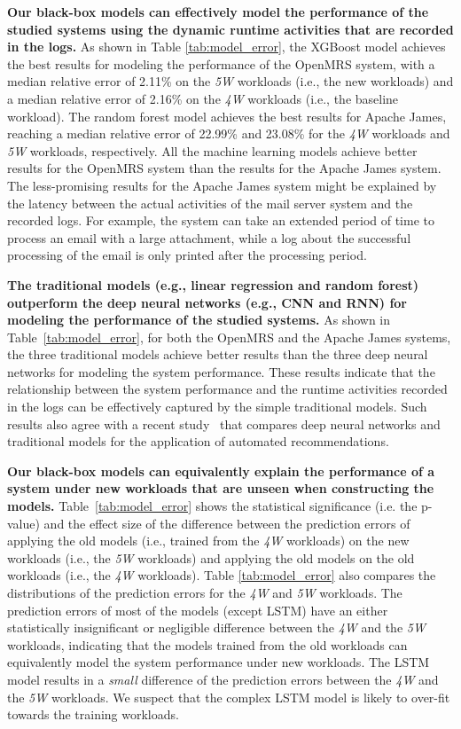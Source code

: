 \noindent\textbf{Our black-box models can effectively model the performance of the studied systems using the dynamic runtime activities that are recorded in the logs.} 
As shown in Table \ref{tab:model_error}, the XGBoost model achieves the best results for modeling the performance of the OpenMRS system, with a median relative error of 2.11\% on the \emph{5W} workloads (i.e., the new workloads) and a median relative error of 2.16\% on the \emph{4W} workloads (i.e., the baseline workload). 
The random forest model achieves the best results for Apache James, reaching a median relative error of 22.99\% and 23.08\% for the \emph{4W} workloads and \emph{5W} workloads, respectively. 
All the machine learning models achieve better results for the OpenMRS system than the results for the Apache James system.
The less-promising results for the Apache James system might be explained by the latency between the actual activities of the mail server system and the recorded logs. For example, the system can take an extended period of time to process an email with a large attachment, while a log about the successful processing of the email is only printed after the processing period.

\noindent\textbf{The traditional models (e.g., linear regression and random forest) outperform the deep neural networks (e.g., CNN and RNN) for modeling the performance of the studied systems.}
As shown in Table~\ref{tab:model_error}, for both the OpenMRS and the Apache James systems, the three traditional models achieve better results than the three deep neural networks for modeling the system performance.
These results indicate that the relationship between the system performance and the runtime activities recorded in the logs can be effectively captured by the simple traditional models.
Such results also agree with a recent study~\citep{DacremaArxiv2019} that compares deep neural networks and traditional models for the application of automated recommendations.


\noindent\textbf{Our black-box models can equivalently explain the performance of a system under new workloads that are unseen when constructing the models.}
Table~\ref{tab:model_error} shows the statistical significance (i.e. the p-value) and the effect size of the difference between the prediction errors of applying the old models (i.e., trained from the \emph{4W} workloads) on the new workloads (i.e., the \emph{5W} workloads) and applying the old models on the old workloads (i.e., the \emph{4W} workloads). 
Table \ref{tab:model_error} also compares the distributions of the prediction errors for the \emph{4W} and \emph{5W} workloads.
The prediction errors of most of the models (except LSTM) have an either statistically insignificant or negligible difference between the \emph{4W} and the \emph{5W} workloads, indicating that the models trained from the old workloads can equivalently model the system performance under new workloads.
The LSTM model results in a \emph{small} difference of the prediction errors between the \emph{4W} and the \emph{5W} workloads. We suspect that the complex LSTM model is likely to over-fit towards the training workloads.

